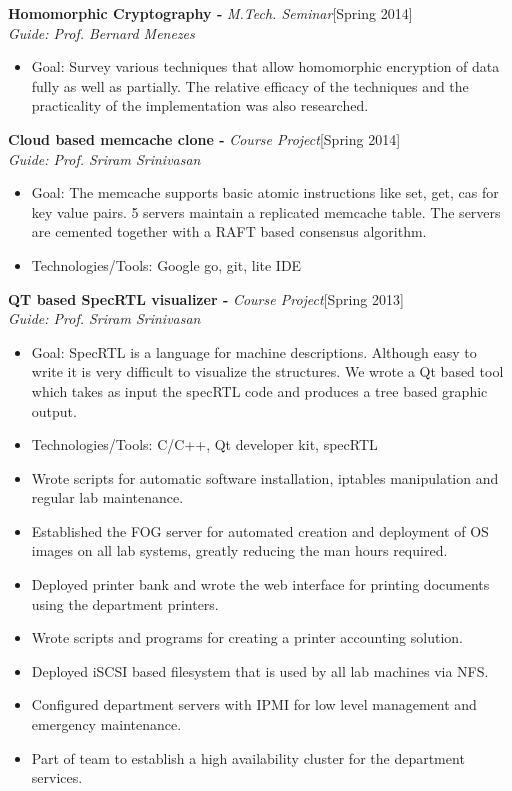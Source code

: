 \documentclass[a4paper,10pt]{article}
\newcommand{\header}[1]{
\begin{center}
\fbox{\begin{minipage}{\textwidth}
\raggedright \large \bf #1
\end{minipage}}
\end{center}
\vspace{-0.3cm}
}
\begin{document}
\noindent
\textbf{Homomorphic Cryptography -} \emph{M.Tech. Seminar}\hfill[Spring 2014] \\
\emph{Guide: Prof. Bernard Menezes}
\begin{itemize}
 \item Goal: Survey various techniques that allow homomorphic encryption of data fully as well as partially. The relative efficacy of the techniques and the practicality of the implementation was also researched.
\end{itemize}

\noindent
\textbf{Cloud based memcache clone -} \emph{Course Project}\hfill[Spring 2014] \\
\emph{Guide: Prof. Sriram Srinivasan}
\begin{itemize}
 \item Goal: The memcache supports basic atomic instructions like set, get, cas for key value pairs. 5 servers maintain a replicated memcache table. The servers are cemented together with a RAFT based consensus algorithm.
 \item Technologies/Tools: Google go, git, lite IDE
\end{itemize}

\noindent
\textbf{QT based SpecRTL  visualizer -} \emph{Course Project}\hfill[Spring 2013] \\
\emph{Guide: Prof. Sriram Srinivasan}
\begin{itemize}
 \item Goal: SpecRTL is a language for machine descriptions. Although easy to write it is very difficult to visualize the structures. We wrote a Qt based tool which takes as input the specRTL code and produces a tree based graphic output.
 \item Technologies/Tools: C/C++, Qt developer kit, specRTL
\end{itemize}
\endgroup

\vspace{-0.8cm}
\header{RA Work - System Administrator}
\vspace{-0.2cm}
\begin{itemize}
 \item Wrote scripts for automatic software installation, iptables manipulation and regular lab maintenance.
 \item Established the FOG server for automated creation and deployment of OS images on all lab systems, greatly reducing the man hours required.
 \item Deployed printer bank and wrote the web interface for printing documents using the department printers.
 \item Wrote scripts and programs for creating a printer accounting solution.
 \item Deployed iSCSI based filesystem that is used by all lab machines via NFS.
 \item Configured department servers with IPMI for low level management and emergency maintenance.
 \item Part of team to establish a high availability cluster for the department services.
\end{itemize}
\end{document}
